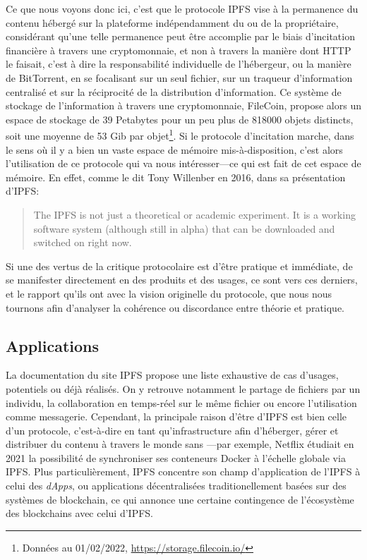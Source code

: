 \documentclass{article}
\begin{document}
Ce que nous voyons donc ici, c'est que le protocole IPFS vise à la permanence du contenu hébergé sur la plateforme indépendamment du ou de la propriétaire, considérant qu'une telle permanence peut être accomplie par le biais d'incitation financière à travers une cryptomonnaie, et non à travers la manière dont HTTP le faisait, c'est à dire la responsabilité individuelle de l'hébergeur, ou la manière de BitTorrent, en se focalisant sur un seul fichier, sur un traqueur d'information centralisé et sur la réciprocité de la distribution d'information. Ce système de stockage de l'information à travers une cryptomonnaie, FileCoin, propose alors un espace de stockage de 39 Petabytes pour un peu plus de 818000 objets distincts, soit une moyenne de 53 Gib par objet\footnote{Données au 01/02/2022, \url{https://storage.filecoin.io/}}. Si le protocole d'incitation marche, dans le sens où il y a bien un vaste espace de mémoire mis-à-disposition, c'est alors l'utilisation de ce protocole qui va nous intéresser—ce qui est fait de cet espace de mémoire. En effet, comme le dit Tony Willenber en 2016, dans sa présentation d'IPFS:

\begin{quote}
    The IPFS is not just a theoretical or academic experiment. It is a working software system (although still in alpha) that can be downloaded and switched on right now.\cite{willenberg_ipfs_2018}
\end{quote}

Si une des vertus de la critique protocolaire est d'être pratique et immédiate, de se manifester directement en des produits et des usages, ce sont vers ces derniers, et le rapport qu'ils ont avec la vision originelle du protocole, que nous nous tournons afin d'analyser la cohérence ou discordance entre théorie et pratique.

\subsection{Applications}


La documentation du site IPFS propose une liste exhaustive de cas d'usages, potentiels ou déjà réalisés. On y retrouve notamment le partage de fichiers par un individu,  la collaboration en temps-réel sur le même fichier ou encore l'utilisation comme messagerie. Cependant, la principale raison d'être d'IPFS est bien celle d'un protocole, c'est-à-dire en tant qu'infrastructure afin d'héberger, gérer et distribuer du contenu à travers le monde sans —par exemple, Netflix étudiait en 2021 la possibilité de synchroniser ses conteneurs Docker à l'échelle globale via IPFS\cite{noauthor_new_2020}. Plus particulièrement, IPFS concentre son champ d'application de l'IPFS à celui des \emph{dApps}, ou applications décentralisées traditionellement basées sur des systèmes de blockchain, ce qui annonce une certaine contingence de l'écosystème des blockchains avec celui d'IPFS.
\end{document}
